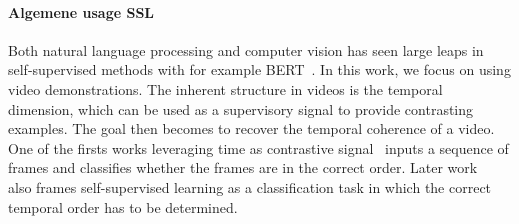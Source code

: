 \documentclass[\home/main.tex]{subfiles}
\begin{document}
\paragraph{Algemene usage SSL}
Both natural language processing and computer vision has seen large leaps in self-supervised methods with for example BERT~\cite{Devlin2018}. In this work, we focus on using video demonstrations. The inherent structure in videos is the temporal dimension, which can be used as a supervisory signal to provide contrasting examples. The goal then becomes to recover the temporal coherence of a video. One of the firsts works leveraging time as contrastive signal~\cite{Misra2016} inputs a sequence of frames and classifies whether the frames are in the correct order. Later work~\cite{Lee2017,Fernando2017} also frames self-supervised learning as a classification task in which the correct temporal order has to be determined. 
\end{document}
